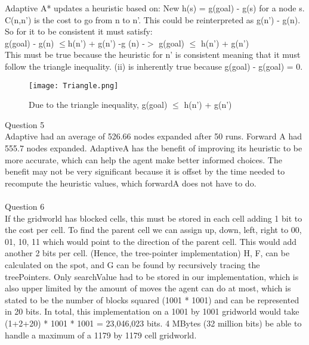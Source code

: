 \documentclass{article}
\begin{document}
	Adaptive A* updates a heuristic based on: New h(s) = g(goal) - g(s) for a node s.  
C(n,n’) is the cost to go from n to n’.  This could be reinterpreted as g(n’) - g(n).  So for it to be consistent it must satisfy:\\
g(goal) - g(n) $\leq$h(n’) + g(n’) -g (n) -$>$ g(goal) $\leq$ h(n’) + g(n’)\\
This must be true because the heuristic for n’ is consistent meaning that it must follow the triangle inequality.  (ii) is inherently true because g(goal) - g(goal) = 0.  
\begin{figure}
  \texttt{[image: Triangle.png]}
  \caption{Due to the triangle inequality, g(goal) $\leq$ h(n’) + g(n’)}
\end{figure}
\clearpage

Question 5
\\
Adaptive had an average of 526.66 nodes expanded after 50 runs.  Forward A had 555.7 nodes expanded.  AdaptiveA has the benefit of improving its heuristic to be more accurate, which can help the agent make better informed choices. The benefit may not be very significant because it is offset by the time needed to recompute the heuristic values, which forwardA does not have to do.  
\\\\
Question 6
\\
If the gridworld has blocked cells, this must be stored in each cell adding 1 bit to the cost per cell.  To find the parent cell we can assign {up, down, left, right} to {00, 01, 10, 11} which would point to the direction of the parent cell.  This would add another 2 bits per cell. (Hence, the tree-pointer implementation)   H, F, can be calculated on the spot, and G can be found by recursively tracing the treePointers. Only searchValue had to be stored in our implementation, which is also upper limited by the amount of moves the agent can do at most, which is stated to be the number of blocks squared (1001 * 1001) and can be represented in 20 bits. In total, this implementation on a 1001 by 1001 gridworld would take (1+2+20) * 1001 * 1001 = 23,046,023 bits.  4 MBytes (32 million bits) be able to handle a maximum of a 1179 by 1179 cell gridworld.  
\end{document}
